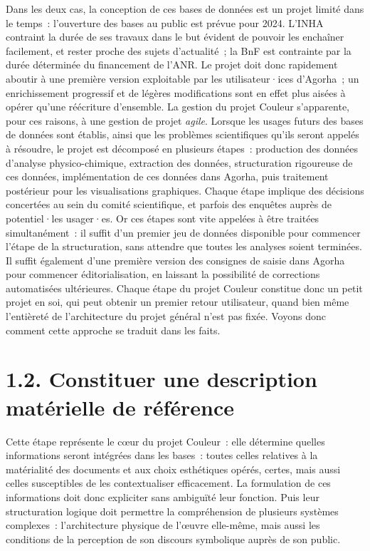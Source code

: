 \documentclass[a4paper,12pt, twoside]{book}
\begin{document}
Dans les deux cas, la conception de ces bases de données est un projet limité dans le temps~: l’ouverture des bases au public est prévue pour 2024. L’INHA contraint la durée de ses travaux dans le but évident de pouvoir les enchaîner facilement, et rester proche des sujets d’actualité~; la BnF est contrainte par la durée déterminée du financement de l’ANR. Le projet doit donc rapidement aboutir à une première version exploitable par les utilisateur·ices d’Agorha~; un enrichissement progressif et de légères modifications sont en effet plus aisées à opérer qu’une réécriture d’ensemble. La gestion du projet Couleur s’apparente, pour ces raisons, à une gestion de projet \textit{agile}. Lorsque les usages futurs des bases de données sont établis, ainsi que les problèmes scientifiques qu’ils seront appelés à résoudre, le projet est décomposé en plusieurs étapes~: production des données d’analyse physico-chimique, extraction des données, structuration rigoureuse de ces données, implémentation de ces données dans Agorha, puis traitement postérieur pour les visualisations graphiques. Chaque étape implique des décisions concertées au sein du comité scientifique, et parfois des enquêtes auprès de potentiel·les usager·es. Or ces étapes sont vite appelées à être traitées simultanément~: il suffit d’un premier jeu de données disponible pour commencer l’étape de la structuration, sans attendre que toutes les analyses soient terminées. Il suffit également d’une première version des consignes de saisie dans Agorha pour commencer éditorialisation, en laissant la possibilité de corrections automatisées ultérieures. Chaque étape du projet Couleur constitue donc un petit projet en soi, qui peut obtenir un premier retour utilisateur, quand bien même l’entièreté de l’architecture du projet général n’est pas fixée. Voyons donc comment cette approche se traduit dans les faits.

\section*{1.2. Constituer une description matérielle de référence}

Cette étape représente le cœur du projet Couleur~: elle détermine quelles informations seront intégrées dans les bases~: toutes celles relatives à la matérialité des documents et aux choix esthétiques opérés, certes, mais aussi celles susceptibles de les contextualiser efficacement. La formulation de ces informations doit donc expliciter sans ambiguïté leur fonction. Puis leur structuration logique doit permettre la compréhension de plusieurs systèmes complexes~: l’architecture physique de l’œuvre elle-même, mais aussi les conditions de la perception de son discours symbolique auprès de son public.
\end{document}

